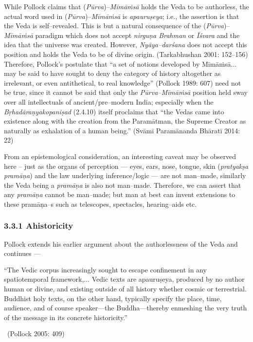 While Pollock claims that (\textit{Pūrva})–\textit{Mīmāṁsā} holds the Veda to be authorless, the actual word used in (\textit{Pūrva})–\textit{Mīmāṁsā} is \textit{apauruṣeya}; i.e., the assertion is that the Veda is self–revealed. This is but a natural consequence of the (\textit{Pūrva})–\textit{Mīmāṁsā} paradigm which does not accept \textit{nirguṇa Brahman} or \textit{Īśvara} and the idea that the universe was created. However, \textit{Nyāya–darśana} does not accept this position and holds the Veda to be of divine origin. (Tarkabhushan 2001: 152–156) Therefore, Pollock’s postulate that “a set of notions developed by Mīmāṁsā... may be said to have sought to deny the category of history altogether as irrelevant, or even antithetical, to real knowledge” (Pollock 1989: 607) need not be true, since it cannot be said that only the \textit{Pūrva–Mīmāṁsā} position held sway over all intellectuals of ancient/pre–modern India; especially when the \textit{Bṛhadāraṇyakopaniṣad} (2.4.10) itself proclaims that “the Vedas came into existence along with the creation from the Paramātman, the Supreme Creator as naturally as exhalation of a human being.” (Svāmī Paramānanda Bhāratī 2014: 22)

From an epistemological consideration, an interesting caveat may be observed here – just as the organs of perception — eyes, ears, nose, tongue, skin (\textit{pratyakṣa pramāṇa}) and the law underlying inference/logic — are not man–made, similarly the Veda being a \textit{pramāṇa} is also not man–made. Therefore, we can assert that any \textit{pramāṇa} cannot be man–made; but man at best can invent extensions to these pramāṇa–s such as telescopes, spectacles, hearing–aids etc.

\subsubsection*{3.3.1 Ahistoricity}

Pollock extends his earlier argument about the authorlessness of the Veda and continues —

\begin{myquote}
“The Vedic corpus increasingly sought to escape confinement in any spatiotemporal framework,... Vedic texts are apauruṣeya, produced by no author human or divine, and existing outside of all history whether cosmic or terrestrial. Buddhist holy texts, on the other hand, typically specify the place, time, audience, and of course speaker—the Buddha—thereby enmeshing the very truth of the message in its concrete historicity.” 

~\hfill (Pollock 2005: 409)
\end{myquote}

